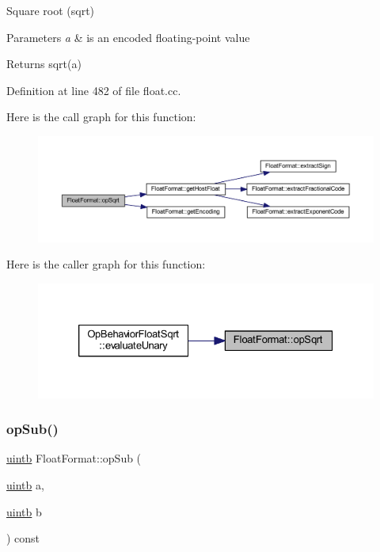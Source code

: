 Square root (sqrt) 


\begin{DoxyParams}{Parameters}
{\em a} & is an encoded floating-\/point value \\
\hline
\end{DoxyParams}
\begin{DoxyReturn}{Returns}
sqrt(a) 
\end{DoxyReturn}


Definition at line 482 of file float.\+cc.

Here is the call graph for this function\+:
\nopagebreak
\begin{figure}[H]
\begin{center}
\leavevmode
\includegraphics[width=350pt]{class_float_format_a13cc7817eee998adc9699333cb8f144d_cgraph}
\end{center}
\end{figure}
Here is the caller graph for this function\+:
\nopagebreak
\begin{figure}[H]
\begin{center}
\leavevmode
\includegraphics[width=326pt]{class_float_format_a13cc7817eee998adc9699333cb8f144d_icgraph}
\end{center}
\end{figure}
\mbox{\label{class_float_format_affc23eaa38dae2db40e8e16c9cf9c821}} 
\subsubsection{\texorpdfstring{opSub()}{opSub()}}
{\footnotesize\ttfamily \mbox{\hyperlink{types_8h_a2db313c5d32a12b01d26ac9b3bca178f}{uintb}} Float\+Format\+::op\+Sub (\begin{DoxyParamCaption}\item[{\mbox{\hyperlink{types_8h_a2db313c5d32a12b01d26ac9b3bca178f}{uintb}}}]{a,  }\item[{\mbox{\hyperlink{types_8h_a2db313c5d32a12b01d26ac9b3bca178f}{uintb}}}]{b }\end{DoxyParamCaption}) const}



